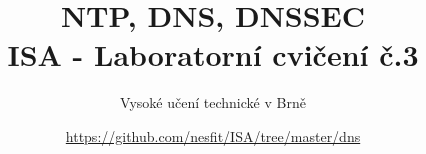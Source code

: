 \documentclass[a4paper,11pt]{article}
\title{NTP, DNS, DNSSEC\\
{\bf\large ISA - Laboratorní cvičení č.3}}
\author{Vysoké učení technické v Brně}
\date{\url{https://github.com/nesfit/ISA/tree/master/dns}}
\begin{document}
{\let\newpage\relax\maketitle}


\end{document}
